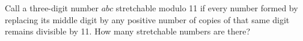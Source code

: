 Call a three-digit number $abc$ stretchable modulo 11 if every number formed by replacing its middle digit by any positive number of copies of that same digit remains divisible by 11. How many stretchable numbers are there?
